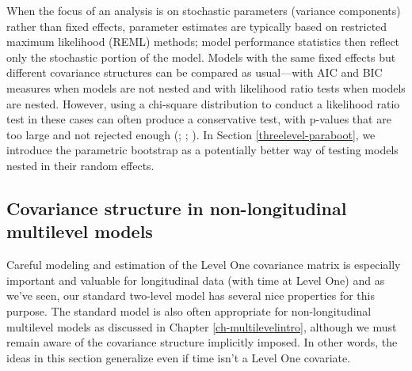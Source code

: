 \documentclass[
]{krantz}
\begin{document}
When the focus of an analysis is on stochastic parameters (variance components) rather than fixed effects, parameter estimates are typically based on restricted maximum likelihood (REML) methods; model performance statistics then reflect only the stochastic portion of the model. Models with the same fixed effects but different covariance structures can be compared as usual---with AIC and BIC measures when models are not nested and with likelihood ratio tests when models are nested. However, using a chi-square distribution to conduct a likelihood ratio test in these cases can often produce a conservative test, with p-values that are too large and not rejected enough (\citet{Bryk2002}; \citet{Singer2003}; \citet{Faraway2005}). In Section \ref{threelevel-paraboot}, we introduce the parametric bootstrap as a potentially better way of testing models nested in their random effects.

\hypertarget{covariance-structure-in-non-longitudinal-multilevel-models}{%
\subsection{Covariance structure in non-longitudinal multilevel models}\label{covariance-structure-in-non-longitudinal-multilevel-models}}

Careful modeling and estimation of the Level One covariance matrix is especially important and valuable for longitudinal data (with time at Level One) and as we've seen, our standard two-level model has several nice properties for this purpose. The standard model is also often appropriate for non-longitudinal multilevel models as discussed in Chapter \ref{ch-multilevelintro}, although we must remain aware of the covariance structure implicitly imposed. In other words, the ideas in this section generalize even if time isn't a Level One covariate.
\end{document}
